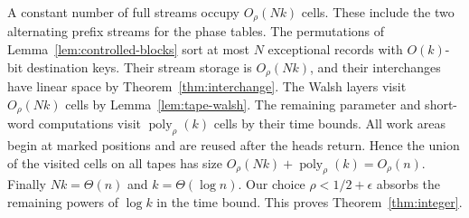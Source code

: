 A constant number of full streams occupy \(O_\rho(Nk)\) cells.
These include the two alternating prefix streams for the phase tables.
The permutations of Lemma~\ref{lem:controlled-blocks} sort at most
\(N\) exceptional records with \(O(k)\)-bit destination keys. Their
stream storage is \(O_\rho(Nk)\), and their interchanges have linear
space by Theorem~\ref{thm:interchange}. The Walsh layers visit
\(O_\rho(Nk)\) cells by Lemma~\ref{lem:tape-walsh}. The remaining
parameter and short-word computations visit
\(\operatorname{poly}_\rho(k)\) cells by their time bounds. All work
areas begin at marked positions and are reused after the heads return.
Hence the union of the visited cells on all tapes has size
\(O_\rho(Nk)+\operatorname{poly}_\rho(k)=O_\rho(n)\).
Finally \(Nk=\Theta(n)\) and \(k=\Theta(\log n)\). Our choice
\(\rho<1/2+\epsilon\) absorbs the remaining powers of \(\log k\)
in the time bound. This proves Theorem~\ref{thm:integer}.
